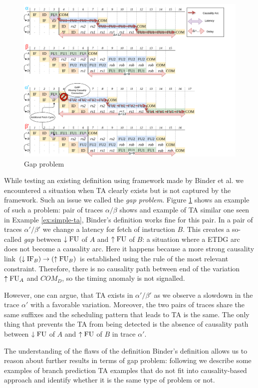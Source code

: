 \begin{figure}[H]
    \centering
    \includegraphics[width=\textwidth]{figures/gap-problem.png}
    \caption{Gap problem}
    \label{fig:gap-problem}
\end{figure}

While testing an existing definition using framework made by Binder et al. we encountered a situation when TA clearly exists but is not captured by the framework. Such an issue we called the \textit{gap problem}. Figure \ref{fig:gap-problem} shows an example of such a problem: pair of traces $\alpha/\beta$ shows and example of TA similar one seen in Example \ref{ex:simple-ta}, Binder's definition works fine for this pair. In a pair of traces $\alpha'/\beta'$ we change a latency for fetch of instruction $B$. This creates a so-called \textit{gap} between $\downarrow\mathrm{FU}$ of $A$ and $\uparrow\mathrm{FU}$ of $B$: a situation where a ETDG arc does not become a causality arc. Here it happens because a more strong causality link $(\downarrow\mathrm{IF}_B) \rightarrow (\uparrow\mathrm{FU}_B)$ is established using the rule of the most relevant constraint. Therefore, there is no causality path between end of the variation $\uparrow\mathrm{FU}_A$ and $COM_D$, so the timing anomaly is not signalled.

However, one can argue, that TA exists in $\alpha'/\beta'$ as we observe a slowdown in the trace $\alpha'$ with a favorable variation. Moreover, the two pairs of traces share the same suffixes and the scheduling pattern that leads to TA is the same. The only thing that prevents the TA from being detected is the absence of causality path between $\downarrow\mathrm{FU}$ of $A$ and $\uparrow\mathrm{FU}$ of $B$ in trace $\alpha'$.

The understanding of the flaws of the definition Binder's definition \cite{binder_definitions_2022} allows us to reason about further results in terms of gap problem: following we describe some examples of branch prediction TA examples that do not fit into causality-based approach and identify whether it is the same type of problem or not.




